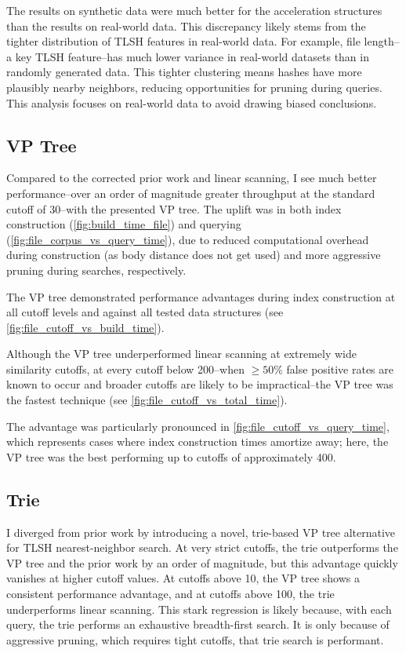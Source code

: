 \documentclass[5p,final]{elsarticle}
\begin{document}
The results on synthetic data were much better for the acceleration
structures than the results on real-world data. This discrepancy
likely stems from the tighter distribution of TLSH features in
real-world data. For example, file length--a key TLSH feature--has
much lower variance in real-world datasets than in randomly
generated data. This tighter clustering means hashes have more
plausibly nearby neighbors, reducing opportunities for pruning during
queries. This analysis focuses on real-world data to avoid drawing
biased conclusions.

\subsection{VP Tree}

Compared to the corrected prior work and linear scanning, I see much
better performance--over an order of magnitude greater throughput at the
standard cutoff of 30--with the presented VP tree. The uplift was in both
index construction (\autoref{fig:build_time_file}) and querying
(\autoref{fig:file_corpus_vs_query_time}), due to reduced
computational overhead during construction (as body distance does not
get used) and more aggressive pruning during searches, respectively.

The VP tree demonstrated performance advantages during index
construction at all cutoff levels and against all tested data
structures (see \autoref{fig:file_cutoff_vs_build_time}).

Although the VP tree underperformed linear scanning at extremely wide
similarity cutoffs, at every cutoff below 200--when $\geq\!50\%$
false positive rates are known to occur
\cite{oliverTLSHLocalitySensitive2013} and broader cutoffs are likely
to be impractical--the VP tree was the fastest technique
(see \autoref{fig:file_cutoff_vs_total_time}).

The advantage was particularly pronounced in
\autoref{fig:file_cutoff_vs_query_time}, which represents cases where
index construction times amortize away; here, the VP tree was
the best performing up to cutoffs of approximately 400.

\subsection{Trie}

I diverged from prior work by introducing a novel,
trie-based VP tree alternative for TLSH nearest-neighbor search. At
very strict cutoffs, the trie outperforms the VP tree and
the prior work by an order of magnitude, but this advantage quickly
vanishes at higher cutoff values. At cutoffs above 10, the VP tree
shows a consistent performance advantage, and at cutoffs above 100,
the trie underperforms linear scanning. This stark regression is
likely because, with each query, the trie performs an exhaustive
breadth-first search. It is only because of aggressive pruning,
which requires tight cutoffs, that trie search is performant.
\end{document}
